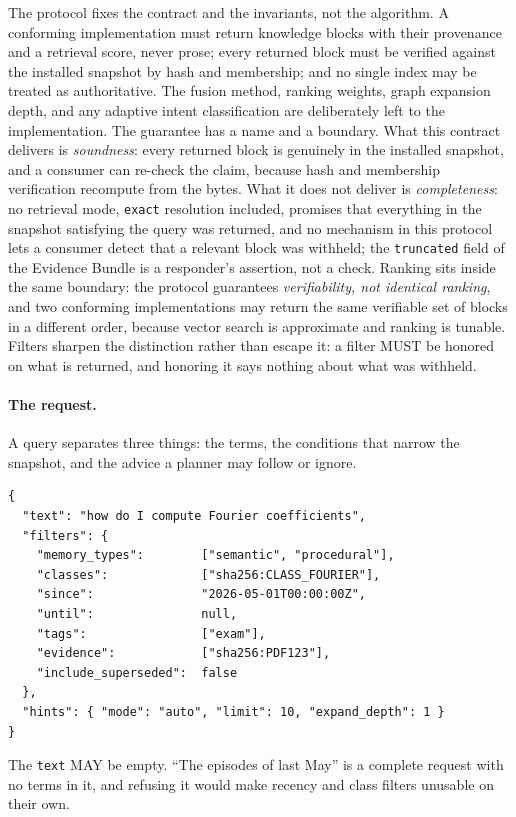 \documentclass[11pt,a4paper]{article}
\begin{document}
The protocol fixes the contract and the invariants, not the algorithm. A
conforming implementation must return knowledge blocks with their provenance
and a retrieval score, never prose; every returned block must be verified
against the installed snapshot by hash and membership; and no single index may
be treated as authoritative. The fusion method, ranking weights, graph
expansion depth, and any adaptive intent classification are deliberately left
to the implementation. The guarantee has a name and a boundary. What this contract delivers is
\emph{soundness}: every returned block is genuinely in the installed snapshot,
and a consumer can re-check the claim, because hash and membership
verification recompute from the bytes. What it does not deliver is
\emph{completeness}: no retrieval mode, \texttt{exact} resolution included,
promises that everything in the snapshot satisfying the query was returned,
and no mechanism in this protocol lets a consumer detect that a relevant block
was withheld; the \texttt{truncated} field of the Evidence Bundle is a
responder's assertion, not a check. Ranking sits inside the same boundary: the
protocol guarantees \emph{verifiability, not identical ranking}, and two
conforming implementations may return the same verifiable set of blocks in a
different order, because vector search is approximate and ranking is tunable.
Filters sharpen the distinction rather than escape it: a filter MUST be
honored on what is returned, and honoring it says nothing about what was
withheld.

\paragraph{The request.}
A query separates three things: the terms, the conditions that narrow the
snapshot, and the advice a planner may follow or ignore.
\begin{verbatim}
{
  "text": "how do I compute Fourier coefficients",
  "filters": {
    "memory_types":        ["semantic", "procedural"],
    "classes":             ["sha256:CLASS_FOURIER"],
    "since":               "2026-05-01T00:00:00Z",
    "until":               null,
    "tags":                ["exam"],
    "evidence":            ["sha256:PDF123"],
    "include_superseded":  false
  },
  "hints": { "mode": "auto", "limit": 10, "expand_depth": 1 }
}
\end{verbatim}
The \texttt{text} MAY be empty. ``The episodes of last May'' is a complete
request with no terms in it, and refusing it would make recency and class filters unusable on their own.
\end{document}
